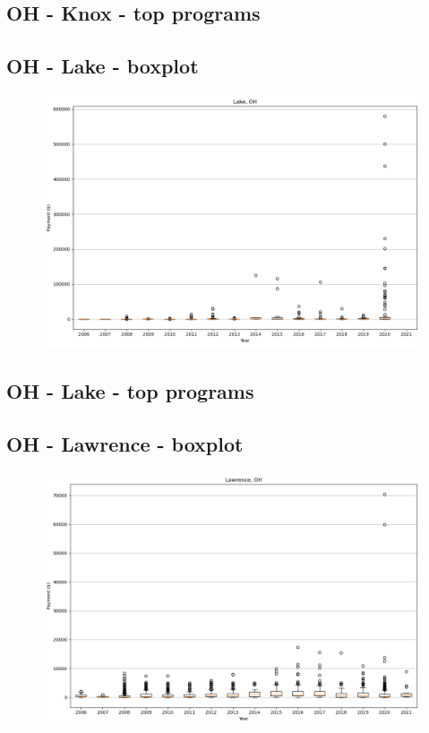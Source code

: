 \subsection*{OH - Knox - top programs}

\newpage
\subsection*{OH - Lake - boxplot}
\begin{figure}[h]
\centering
\includegraphics[width=7in]{../output/boxplots/counties/Lake-OH_boxplot.png}
\end{figure}


\subsection*{OH - Lake - top programs}

\newpage
\subsection*{OH - Lawrence - boxplot}
\begin{figure}[h]
\centering
\includegraphics[width=7in]{../output/boxplots/counties/Lawrence-OH_boxplot.png}
\end{figure}


